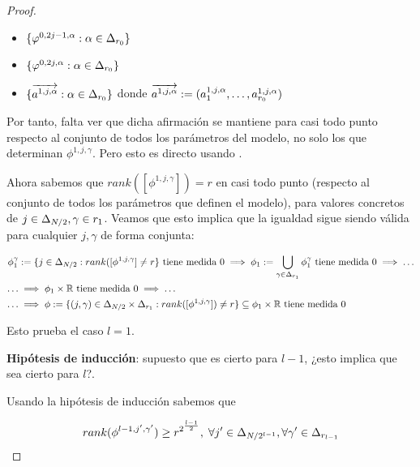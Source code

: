 \begin{proof}
    \begin{itemize}
        \item $\{ \varphi^{0, 2j - 1, \alpha}: \alpha \in \Delta_{r_0} \}$
        \item $\{ \varphi^{0, 2j, \alpha}: \alpha \in \Delta_{r_0} \}$
        \item $\{ \overrightarrow{a^{1, j, \alpha}} : \alpha \in \Delta_{r_0} \}$ donde $\overrightarrow{a^{1, j, \alpha}} := (a^{1, j, \alpha}_1, \ldots,  a^{1, j, \alpha}_{r_0})$
    \end{itemize}

    Por tanto, falta ver que dicha afirmación se mantiene para casi todo punto respecto al conjunto de todos los parámetros del modelo, no solo los que determinan $\phi^{1, j, \gamma}$. Pero esto es directo usando .

    Ahora sabemos que $rank([\phi^{1, j, \gamma}]) = r$ en casi todo punto (respecto al conjunto de todos los parámetros que definen el modelo), para valores concretos de $j \in \Delta_{N/2}, \gamma \in r_1$. Veamos que esto implica que la igualdad sigue siendo válida para cualquier $j, \gamma$ de forma conjunta:

    \begin{equation}
    \begin{split}
        \phi_1^\gamma &:= \{ j \in \Delta_{N/2}: rank([\phi^{1, j, \gamma}] \neq r \} \text{ tiene medida } 0 \implies \phi_1 := \bigcup_{\gamma \in \Delta_{r_1}} \phi_1^\gamma \text{ tiene medida } 0 \implies \ldots \\
        \ldots &\implies \phi_1 \times \mathbb{R} \text{ tiene medida } 0 \implies \ldots \\
        \ldots &\implies \phi := \{ (j, \gamma) \in \Delta_{N/2} \times \Delta_{r_1}: rank([\phi^{1, j, \gamma}]) \neq r \} \subseteq \phi_1 \times \mathbb{R} \text{ tiene medida } 0
    \end{split}
    \end{equation}

    Esto prueba el caso $l = 1$.

    \textbf{Hipótesis de inducción}: supuesto que es cierto para $l - 1$, ¿esto implica que sea cierto para $l$?.

    Usando la hipótesis de inducción sabemos que

    \begin{equation}
        rank(\phi^{l-1, j', \gamma'}) \geq r^{2^{\frac{l - 1}{2}}},
        \; \forall j' \in \Delta_{N/2^{l-1}}, \forall \gamma' \in \Delta_{r_{l-1}}
    \end{equation}


\end{proof}
